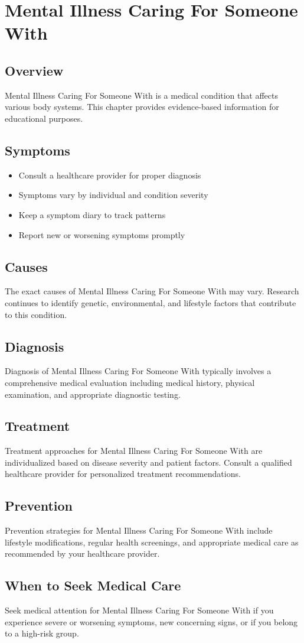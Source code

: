 \chapter{Mental Illness Caring For Someone With}

\section*{Overview}
Mental Illness Caring For Someone With is a medical condition that affects various body systems. This chapter provides evidence-based information for educational purposes.

\section*{Symptoms}
\begin{itemize}
  \item Consult a healthcare provider for proper diagnosis
  \item Symptoms vary by individual and condition severity
  \item Keep a symptom diary to track patterns
  \item Report new or worsening symptoms promptly
\end{itemize}

\section*{Causes}
The exact causes of Mental Illness Caring For Someone With may vary. Research continues to identify genetic, environmental, and lifestyle factors that contribute to this condition.

\section*{Diagnosis}
Diagnosis of Mental Illness Caring For Someone With typically involves a comprehensive medical evaluation including medical history, physical examination, and appropriate diagnostic testing.

\section*{Treatment}
Treatment approaches for Mental Illness Caring For Someone With are individualized based on disease severity and patient factors. Consult a qualified healthcare provider for personalized treatment recommendations.

\section*{Prevention}
Prevention strategies for Mental Illness Caring For Someone With include lifestyle modifications, regular health screenings, and appropriate medical care as recommended by your healthcare provider.

\section*{When to Seek Medical Care}
Seek medical attention for Mental Illness Caring For Someone With if you experience severe or worsening symptoms, new concerning signs, or if you belong to a high-risk group.
\clearpage
